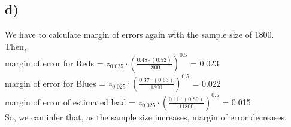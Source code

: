 \documentclass[12pt]{article}
\begin{document}
\subsection*{d)}
We have to calculate margin of errors again with the sample size of 1800.\\
Then,\\
margin of error for Reds = $z_{0.025}\cdot(\frac{0.48\cdot(0.52)}{1800})^{0.5}$ = 0.023\\
margin of error for Blues = $z_{0.025}\cdot(\frac{0.37\cdot(0.63)}{1800})^{0.5}$ = 0.022\\
margin of error of estimated lead = $z_{0.025}\cdot(\frac{0.11\cdot(0.89)}{11800})^{0.5}$ = 0.015\\
So, we can infer that, as the sample size increases, margin of error decreases.\\
\end{document}
